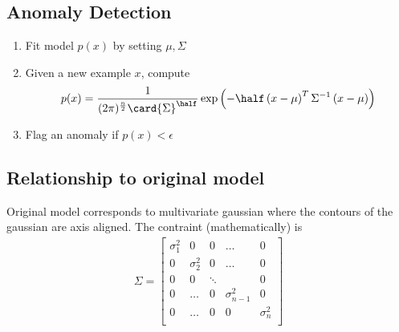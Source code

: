 \subsection{Anomaly Detection}
\begin{enumerate}
    \item Fit model $p(x)$ by setting $\mu, \Sigma$
    \item Given a new example $x$, compute
          \begin{align*}
              p(x) & = \frac{1}{(2\pi)^{\frac{n}{2}}\card{\Sigma}^\half}
              \exp{\left(-\half\left(x-\mu\right)^T\Sigma^{-1}\left(x-\mu\right)\right)} \\
          \end{align*}
    \item Flag an anomaly if $p(x) < \epsilon$
\end{enumerate}

\subsection{Relationship to original model}
Original model corresponds to multivariate gaussian where the contours of the
gaussian are axis aligned. The contraint (mathematically) is
\begin{align*}
    \Sigma = \begin{bmatrix}
        \sigma_1^2 & 0          & 0      & \dots          & 0          \\
        0          & \sigma_2^2 & 0      & \dots          & 0          \\
        0          & 0          & \ddots &                & 0          \\
        0          & \dots      & 0      & \sigma_{n-1}^2 & 0          \\
        0          & \dots      & 0      & 0              & \sigma_n^2 \\
    \end{bmatrix}
\end{align*}


